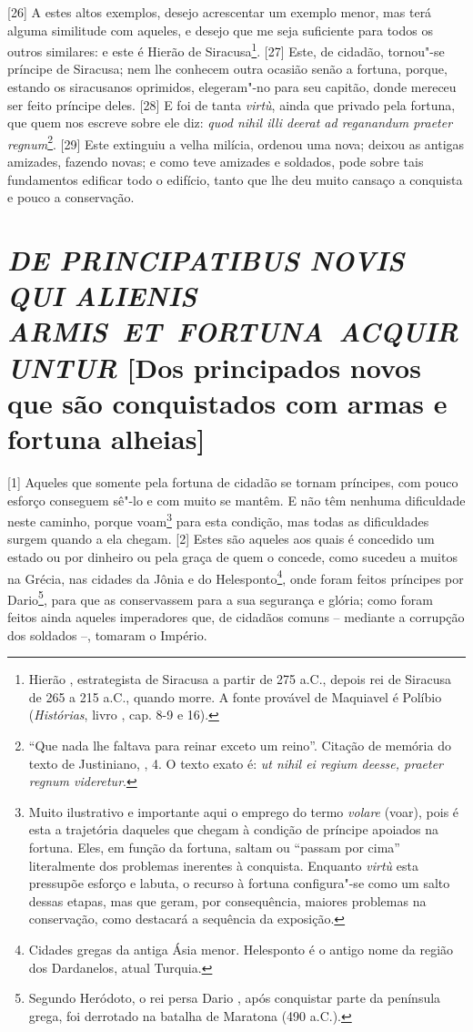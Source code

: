 {[}26{]} A estes altos exemplos, desejo acrescentar um exemplo menor,
mas terá alguma similitude com aqueles, e desejo que me seja suficiente
para todos os outros similares: e este é Hierão de Siracusa\footnote{Hierão , estrategista de Siracusa a partir de 275 a.C., depois rei de Siracusa de 265 a 215 a.C., quando morre. A fonte provável de Maquiavel é Políbio (\emph{Histórias}, livro , cap. 8-9 e 16).}. {[}27{]} Este, de cidadão, tornou"-se príncipe de
Siracusa; nem lhe conhecem outra ocasião senão a fortuna, porque,
estando os siracusanos oprimidos, elegeram"-no para seu capitão, donde
mereceu ser feito príncipe deles. {[}28{]} E foi de tanta \emph{virtù},
ainda que privado pela fortuna, que quem nos escreve sobre ele diz:
\emph{quod nihil illi deerat ad reganandum praeter regnum}\footnote{``Que
  nada lhe faltava para reinar exceto um reino''. Citação de memória do
  texto de Justiniano, , 4. O texto exato é: \emph{ut nihil ei
  regium deesse, praeter regnum videretur}.}. {[}29{]} Este extinguiu a
velha milícia, ordenou uma nova; deixou as antigas amizades, fazendo
novas; e como teve amizades e soldados, pode sobre tais fundamentos
edificar todo o edifício, tanto que lhe deu muito cansaço a conquista e
pouco a conservação.

\quebra\section{\emph{DE PRINCIPATIBUS NOVIS QUI ALIENIS ARMIS~ET~FORTUNA~ACQUIRUNTUR}\break
{[}Dos principados novos que são conquistados com armas e fortuna alheias{]}}

{[}1{]} Aqueles que somente pela fortuna de cidadão se tornam príncipes,
com pouco esforço conseguem sê"-lo e com muito se mantêm. E não têm
nenhuma dificuldade neste caminho, porque voam\footnote{Muito
  ilustrativo e importante aqui o emprego do termo \emph{volare} (voar),
  pois é esta a trajetória daqueles que chegam à condição de príncipe
  apoiados na fortuna. Eles, em função da fortuna, saltam ou ``passam
  por cima'' literalmente dos problemas inerentes à conquista. Enquanto
  \emph{virtù} esta pressupõe esforço e labuta, o recurso à fortuna
  configura"-se como um salto dessas etapas, mas que geram, por
  consequência, maiores problemas na conservação, como destacará a
  sequência da exposição.} para esta condição, mas todas as dificuldades
surgem quando a ela chegam. {[}2{]} Estes são aqueles aos quais é
concedido um estado ou por dinheiro ou pela graça de quem o concede,
como sucedeu a muitos na Grécia, nas cidades da Jônia e do
Helesponto\footnote{Cidades gregas da antiga Ásia menor. Helesponto é o
  antigo nome da região dos Dardanelos, atual Turquia.}, onde foram feitos príncipes por Dario\footnote{Segundo
  Heródoto, o rei persa Dario , após conquistar parte da península
  grega, foi derrotado na batalha de Maratona (490 a.C.).}, para que as
conservassem para a sua segurança e glória; como foram feitos ainda
aqueles imperadores que, de cidadãos comuns -- mediante a corrupção dos
soldados --, tomaram o Império.

